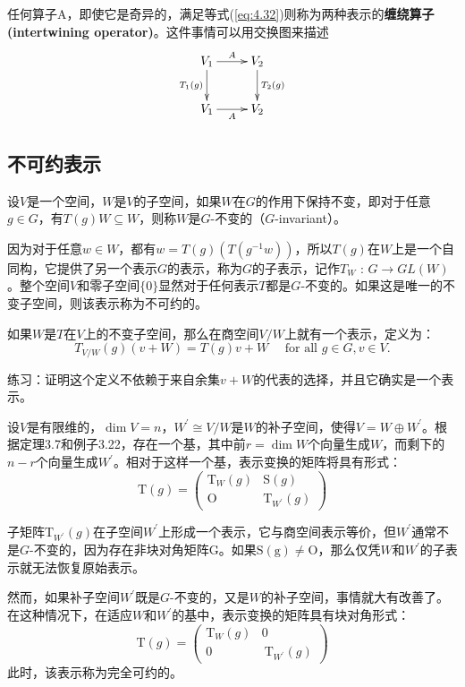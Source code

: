 \documentclass[hyperref,UTF8]{ctexbook}
\begin{document}
任何算子A，即使它是奇异的，满足等式(\ref{eq:4.32})则称为两种表示的\textbf{缠绕算子(intertwining operator)}。这件事情可以用交换图来描述
$$
\xymatrix{
  V_1 \ar[r]^A \ar[d]_{T_1(g)} &
  V_2 \ar[d]^{T_2(g)} \\
  V_1 \ar[r]_{A} &
  V_2
}$$
\subsection{不可约表示}
设$V$是一个空间，$W$是$V$的子空间，如果$W$在$G$的作用下保持不变，即对于任意$g \in G$，有$T(g) W \subseteq W$，则称$W$是$G$-不变的（$G$-invariant）。

因为对于任意$w \in W$，都有$w=T(g)\left(T\left(g^{-1} w\right)\right)$，所以$T(g)$在$W$上是一个自同构，它提供了另一个表示$G$的表示，称为$G$的子表示，记作$T_W$ : $G \rightarrow G L(W)$。整个空间$V$和零子空间$\{0\}$显然对于任何表示$T$都是$G$-不变的。如果这是唯一的不变子空间，则该表示称为不可约的。

如果$W$是$T$在$V$上的不变子空间，那么在商空间$V / W$上就有一个表示，定义为：$$T_{V / W}(g)(v+W)=T(g) v+W \quad \text { for all } g \in G, v \in V .$$

练习：证明这个定义不依赖于来自余集$v+W$的代表的选择，并且它确实是一个表示。

设$V$是有限维的，$\operatorname{dim} V=n$，$W^{\prime} \cong V / W$是$W$的补子空间，使得$V=W \oplus W^{\prime}$。根据定理3.7和例子3.22，存在一个基，其中前$r=\operatorname{dim} W$个向量生成$W$，而剩下的$n-r$个向量生成$W^{\prime}$。相对于这样一个基，表示变换的矩阵将具有形式：$$\mathrm{T}(g)=\begin{pmatrix}
\mathrm{T}_W(g) & \mathrm{S}(g) \\
\mathrm{O} & \mathrm{T}_{W^{\prime}}(g)
\end{pmatrix}$$

子矩阵$\mathrm{T}_{W^{\prime}}(g)$在子空间$W^{\prime}$上形成一个表示，它与商空间表示等价，但$W^{\prime}$通常不是$G$-不变的，因为存在非块对角矩阵$\mathrm{G}$。如果$\mathrm{S}(\mathrm{g}) \neq \mathrm{O}$，那么仅凭$W$和$W^{\prime}$的子表示就无法恢复原始表示。

然而，如果补子空间$W^{\prime}$既是$G$-不变的，又是$W$的补子空间，事情就大有改善了。在这种情况下，在适应$W$和$W^{\prime}$的基中，表示变换的矩阵具有块对角形式：
$$\mathrm{T}(g)=\begin{pmatrix}
\mathrm{T}_W(g) & 0 \\
0 & \mathrm{~T}_{W^{\prime}}(g)
\end{pmatrix}$$
此时，该表示称为完全可约的。
\end{document}
